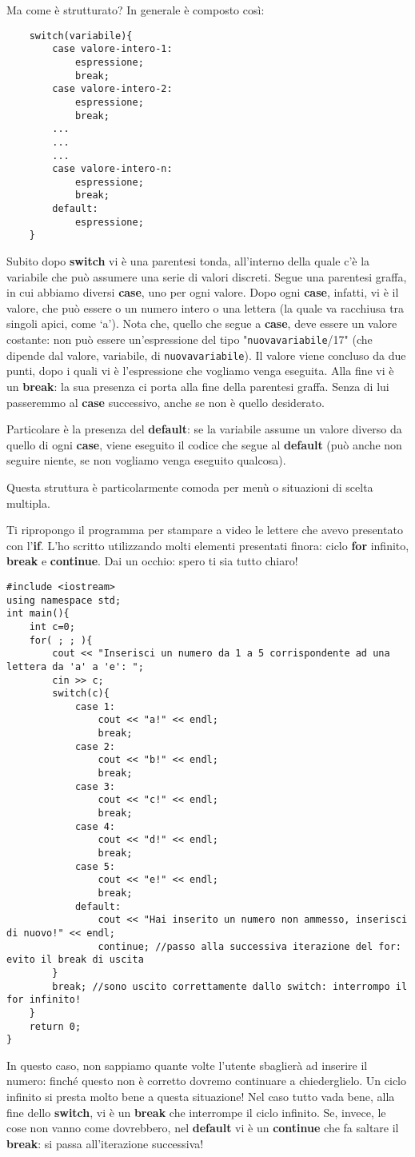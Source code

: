 	Ma come è strutturato? In generale è composto così:
	\begin{lstlisting}
	switch(variabile){
		case valore-intero-1:
			espressione;
			break;
		case valore-intero-2:
			espressione;
			break;
		...
		...
		...
		case valore-intero-n:
			espressione;
			break;
		default:
			espressione;	
	}
	\end{lstlisting}
	
	Subito dopo \textbf{switch} vi è una parentesi tonda, all'interno della quale c'è la variabile che può assumere una serie di valori discreti. Segue una parentesi graffa, in cui abbiamo diversi \textbf{case}, uno per ogni valore. Dopo ogni \textbf{case}, infatti, vi è il valore, che può essere o un numero intero o una lettera (la quale va racchiusa tra singoli apici, come `a'). Nota che, quello che segue a \textbf{case}, deve essere un valore costante: non può essere un'espressione del tipo "\verb|nuovavariabile|/17" (che dipende dal valore, variabile, di \verb|nuovavariabile|). Il valore viene concluso da due punti, dopo i quali vi è l'espressione che vogliamo venga eseguita. Alla fine vi è un \textbf{break}: la sua presenza ci porta alla fine della parentesi graffa.  Senza di lui passeremmo al \textbf{case} successivo, anche se non è quello desiderato.
	
	Particolare è la presenza del \textbf{default}: se la variabile assume un valore diverso da quello di ogni \textbf{case}, viene eseguito il codice che segue al \textbf{default} (può anche non seguire niente, se non vogliamo venga eseguito qualcosa).
	
	Questa struttura è particolarmente comoda per menù o situazioni di scelta multipla.
	
	Ti ripropongo il programma per stampare a video le lettere che avevo presentato con l'\textbf{if}. L'ho scritto utilizzando molti elementi presentati finora: ciclo \textbf{for} infinito, \textbf{break} e \textbf{continue}. Dai un occhio: spero ti sia tutto chiaro!
	\begin{lstlisting}
#include <iostream>
using namespace std;
int main(){
	int c=0;
	for( ; ; ){
		cout << "Inserisci un numero da 1 a 5 corrispondente ad una lettera da 'a' a 'e': ";
		cin >> c;
		switch(c){
			case 1:
				cout << "a!" << endl;
				break;
			case 2:
				cout << "b!" << endl;
				break;
			case 3:
				cout << "c!" << endl;
				break;
			case 4:
				cout << "d!" << endl;
				break;
			case 5:
				cout << "e!" << endl;
				break;
			default:
				cout << "Hai inserito un numero non ammesso, inserisci di nuovo!" << endl;
				continue; //passo alla successiva iterazione del for: evito il break di uscita
		}
		break; //sono uscito correttamente dallo switch: interrompo il for infinito!
	}
	return 0;
}
	\end{lstlisting}
	In questo caso, non sappiamo quante volte l'utente sbaglierà ad inserire il numero: finché questo non è corretto dovremo continuare a chiederglielo. Un ciclo infinito si presta molto bene a questa situazione! Nel caso tutto vada bene, alla fine dello \textbf{switch}, vi è un \textbf{break} che interrompe il ciclo infinito. Se, invece, le cose non vanno come dovrebbero, nel \textbf{default} vi è un \textbf{continue} che fa saltare il \textbf{break}: si passa all'iterazione successiva!
	
